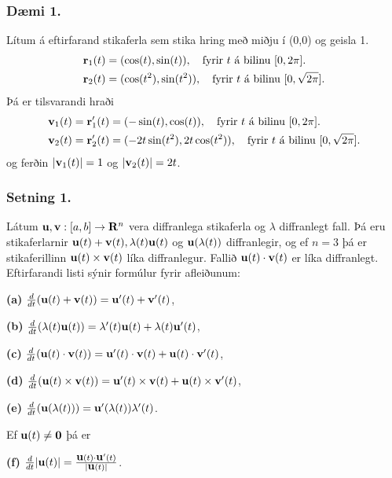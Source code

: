  \subsubsection{\nopagebreak Dæmi 1.}
Lítum á eftirfarand stikaferla sem stika hring með miðju í (0,0) og geisla 1.
 \begin{align*}
\mbox{${\bf r}$}_1(t) &= (\cos(t),\sin(t)), \quad \text{fyrir $t$ á bilinu $[0,2\pi].$} \\
\mbox{${\bf r}$}_2(t) &= (\cos(t^2),\sin(t^2)), \quad \text{fyrir $t$ á bilinu $[0,\sqrt{2\pi}].$} 
\end{align*}
Þá er tilsvarandi hraði
 \begin{align*}
\mbox{${\bf v}$}_1(t) = \mbox{${\bf r}$}_1'(t) &= (-\sin(t),\cos(t)), \quad \text{fyrir $t$ á bilinu $[0,2\pi].$} \\
\mbox{${\bf v}$}_2(t) = \mbox{${\bf r}$}_2'(t) &= (-2t\sin(t^2),2t\cos(t^2)),  \quad \text{fyrir $t$ á bilinu $[0,\sqrt{2\pi}].$}
\end{align*}
og ferðin $|\mbox{${\bf v}$}_1(t)| = 1$ og $|\mbox{${\bf v}$}_2(t)| = 2t$.
 


\subsubsection{\nopagebreak Setning 1.}   Látum $\mbox{${\bf u}$},\mbox{${\bf v}$}:[a,b]\rightarrow \mbox{${\bf R}^n$}$ vera
diffranlega stikaferla og $\lambda$ diffranlegt fall.  Þá eru stikaferlarnir
$\mbox{${\bf u}$}(t)+\mbox{${\bf v}$}(t), \lambda(t)\mbox{${\bf u}$}(t)$ og $\mbox{${\bf u}$}(\lambda(t))$ diffranlegir,
og ef $n=3$ þá er stikaferillinn $\mbox{${\bf u}$}(t)\times \mbox{${\bf v}$}(t)$ líka diffranlegur.
Fallið $\mbox{${\bf u}$}(t)\cdot\mbox{${\bf v}$}(t)$ er líka diffranlegt.  Eftirfarandi listi sýnir
formúlur fyrir afleiðunum: 

{\bf (a)} $\frac{d}{dt}(\mbox{${\bf u}$}(t)+\mbox{${\bf v}$}(t))=\mbox{${\bf u}$}'(t)+\mbox{${\bf v}$}'(t)$,

{\bf (b)} $\frac{d}{dt}(\lambda(t)\mbox{${\bf u}$}(t))=\lambda'(t)\mbox{${\bf u}$}(t)+\lambda(t)\mbox{${\bf u}$}'(t)$,

{\bf (c)}  $\frac{d}{dt}(\mbox{${\bf u}$}(t)\cdot\mbox{${\bf v}$}(t))=\mbox{${\bf u}$}'(t)\cdot\mbox{${\bf v}$}(t)+\mbox{${\bf u}$}(t)\cdot\mbox{${\bf v}$}'(t)$,

{\bf (d)}  $\frac{d}{dt}(\mbox{${\bf u}$}(t)\times\mbox{${\bf v}$}(t))=\mbox{${\bf u}$}'(t)\times\mbox{${\bf v}$}(t)+\mbox{${\bf u}$}(t)\times\mbox{${\bf v}$}'(t)$,

{\bf (e)}  $\frac{d}{dt}(\mbox{${\bf u}$}(\lambda(t)))=\mbox{${\bf u}$}'(\lambda(t))\lambda'(t)$.

\noindent
Ef $\mbox{${\bf u}$}(t)\neq\mbox{${\bf 0}$}$ þá er 

{\bf (f)}  $\frac{d}{dt}|\mbox{${\bf u}$}(t)|=\frac{\mbox{${\bf u}$}(t)\cdot\mbox{${\bf u}$}'(t)}{|\mbox{${\bf u}$}(t)|}$.

\medskip

 

